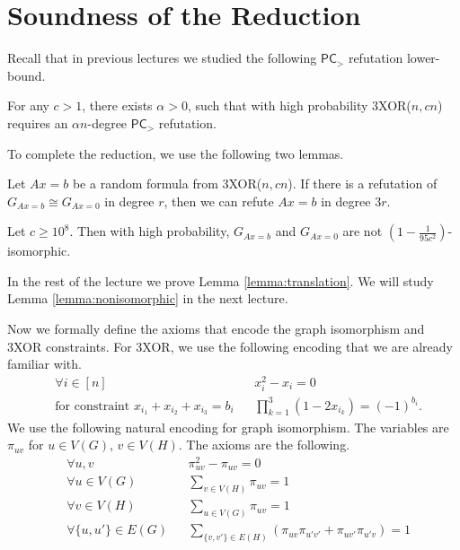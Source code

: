 \documentclass[a4paper,twoside,justified]{tufte-handout}
\begin{document}
\section{Soundness of the Reduction}
Recall that in previous lectures we studied the following $\mathsf{PC}_{>}$ refutation lower-bound.
\begin{lemma}
  For any $c>1$, there exists $\alpha>0$, such that with high probability
  3XOR($n,cn$) requires an $\alpha n$-degree $\mathsf{PC}_{>}$ refutation.
\end{lemma}
To complete the reduction, we use the following two lemmas.
\begin{lemma}\label{lemma:translation}
  Let $Ax=b$ be a random formula from 3XOR($n,cn$). If there is a refutation of $G_{Ax=b} \cong G_{Ax=0}$
  in degree $r$, then we can refute $Ax=b$ in degree $3r$.
\end{lemma}
\begin{lemma}\label{lemma:nonisomorphic}
  Let $c \ge 10^8$. Then with high probability, $G_{Ax=b}$ and $G_{Ax=0}$ are not $\left( 1-\frac{1}{95c^2} \right)$-isomorphic.
\end{lemma}
In the rest of the lecture we prove Lemma \ref{lemma:translation}. We will study Lemma \ref{lemma:nonisomorphic} in
the next lecture.

Now we formally define the axioms that encode the graph isomorphism
and 3XOR constraints.
For 3XOR, we use the following encoding that we are already familiar with.
\begin{align*}
 & \forall i \in [n]                               &  & x_i^2-x_i = 0               \\
 & \text{for constraint $x_{i_1}+x_{i_2}+x_{i_3}=b_i$} &  & \prod_{k=1}^{3}(1-2x_{i_k})=(-1)^{b_i}.
\end{align*}
We use the following natural encoding for graph isomorphism. The variables are
$\pi_{uv}$ for $u \in V(G)$, $v \in V(H)$. The axioms are the following.
\begin{align*}
 & \forall u, v                  &  & \pi_{uv}^2-\pi_{uv}=0       \\
 & \forall u \in V(G)            &  & \sum_{v \in V(H)}\pi_{uv}=1 \\
 & \forall v \in V(H)            &  & \sum_{u \in V(G)}\pi_{uv}=1 \\
 & \forall \{u,u'\} \in E(G)     &  & \sum_{\{v,v'\} \in E(H)} (\pi_{uv}\pi_{u'v'} + \pi_{u v'} \pi_{u' v})=1
\end{align*}
\end{document}
